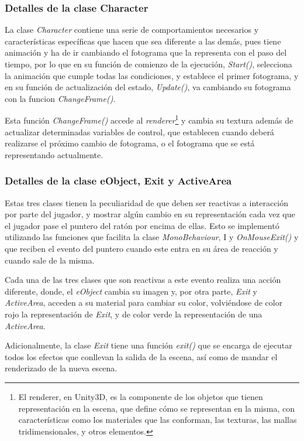 \subsubsection{Detalles de la clase Character}

La clase \textit{Character} contiene una serie de comportamientos necesarios y características específicas que hacen que sea diferente a las demás, pues tiene animación y ha de ir cambiando el fotograma que la representa con el paso del tiempo, por lo que en su función de comienzo de la ejecución, \textit{Start()}, selecciona la animación que cumple todas las condiciones, y establece el primer fotograma, y en su función de actualización del estado, \textit{Update()}, va cambiando su fotograma con la funcion \textit{ChangeFrame()}.

Esta función \textit{ChangeFrame()} accede al \textit{renderer}\footnote{El renderer, en Unity3D, es la componente de los objetos que tienen representación en la escena, que define cómo se representan en la misma, con características como los materiales que las conforman, las texturas, las mallas tridimensionales, y otros elementos.} y cambia su textura además de actualizar determinadas variables de control, que establecen cuando deberá realizarse el próximo cambio de fotograma, o el fotograma que se está representando actualmente.

\subsubsection{Detalles de la clase eObject, Exit y ActiveArea}
\label{objectexitactiveareait1}

Estas tres clases tienen la peculiaridad de que deben ser reactivas a interacción por parte del jugador, y mostrar algún cambio en su representación cada vez que el jugador pase el puntero del ratón por encima de ellas. Esto se implementó utilizando las funciones que facilita la clase \textit{MonoBehaviour}, I y \textit{OnMouseExit()} y que reciben el evento del puntero cuando este entra en su área de reacción y cuando sale de la misma.

Cada una de las tres clases que son reactivas a este evento realiza una acción diferente, donde, el \textit{eObject} cambia su imagen y, por otra parte, \textit{Exit} y \textit{ActiveArea}, acceden a su material para cambiar su color, volviéndose de color rojo la representación de \textit{Exit}, y de color verde la representación de una \textit{ActiveArea}.

Adicionalmente, la clase \textit{Exit} tiene una función \textit{exit()} que se encarga de ejecutar todos los efectos que conllevan la salida de la escena, así como de mandar el renderizado de la nueva escena.

